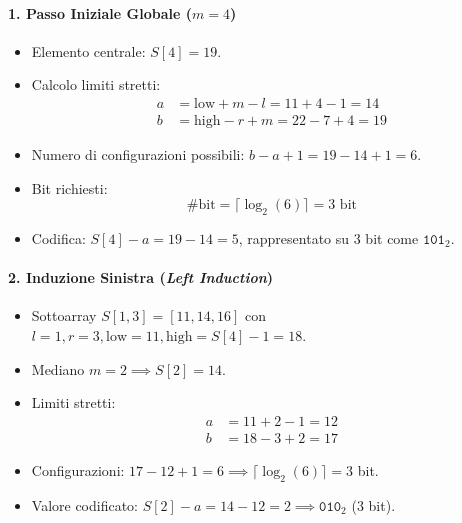\paragraph{1. Passo Iniziale Globale ($m = 4$)}
\begin{itemize}
  \item Elemento centrale: $S[4] = 19$.
  \item Calcolo limiti stretti:
  \begin{align*}
    a &= \text{low} + m - l = 11 + 4 - 1 = 14 \\
    b &= \text{high} - r + m = 22 - 7 + 4 = 19
  \end{align*}
  \item Numero di configurazioni possibili: $b - a + 1 = 19 - 14 + 1 = 6$.
  \item Bit richiesti:
  \begin{equation*}
    \#\text{bit} = \lceil \log_2(6) \rceil = 3 \text{ bit}
  \end{equation*}
  \item Codifica: $S[4] - a = 19 - 14 = 5$, rappresentato su 3 bit come $\texttt{101}_2$.
\end{itemize}

\paragraph{2. Induzione Sinistra (\textit{Left Induction})}
\begin{itemize}
  \item Sottoarray $S[1, 3] = [11, 14, 16]$ con $l = 1, r = 3, \text{low} = 11, \text{high} = S[4] - 1 = 18$.
  \item Mediano $m = 2 \implies S[2] = 14$.
  \item Limiti stretti:
  \begin{align*}
    a &= 11 + 2 - 1 = 12 \\
    b &= 18 - 3 + 2 = 17
  \end{align*}
  \item Configurazioni: $17 - 12 + 1 = 6 \implies \lceil \log_2(6) \rceil = 3$ bit.
  \item Valore codificato: $S[2] - a = 14 - 12 = 2 \implies \texttt{010}_2$ (3 bit).
\end{itemize}

